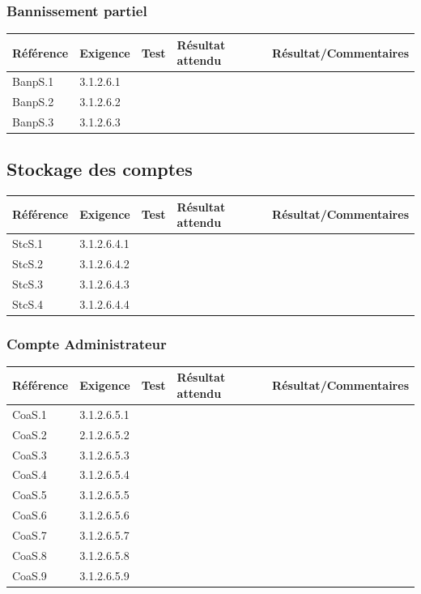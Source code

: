\documentclass[10pt,a4paper,landscape]{report}
\begin{document}
\subsubsection{Bannissement partiel}
\begin{center}
	\bgroup
	\def\arraystretch{1.5}
	\begin{tabular}{|p{1.5cm}|p{2cm}|p{8.5cm}|p{8.5cm}|p{5cm}|}
		\hline
		\rowcolor{gris}Référence & Exigence & Test & Résultat attendu & Résultat/Commentaires\\
		\hline
		BanpS.1 & 3.1.2.6.1 & & & \\
		\hline
		BanpS.2 & 3.1.2.6.2 & & & \\
		\hline
		BanpS.3 & 3.1.2.6.3 & & & \\
		\hline
	\end{tabular}
	\egroup
\end{center}


\subsection{Stockage des comptes}
\begin{center}
	\bgroup
	\def\arraystretch{1.5}
	\begin{tabular}{|p{1.5cm}|p{2cm}|p{8.5cm}|p{8.5cm}|p{5cm}|}
		\hline
		\rowcolor{gris}Référence & Exigence & Test & Résultat attendu & Résultat/Commentaires\\
		\hline
		StcS.1 & 3.1.2.6.4.1 & & & \\
		\hline
		StcS.2 & 3.1.2.6.4.2 & & & \\
		\hline
		StcS.3 & 3.1.2.6.4.3 & & & \\
		\hline
		StcS.4 & 3.1.2.6.4.4 & & & \\
		\hline
	\end{tabular}
	\egroup
\end{center}

\subsubsection{Compte Administrateur}
\begin{center}
	\bgroup
	\def\arraystretch{1.5}
	\begin{tabular}{|p{1.5cm}|p{2cm}|p{8.5cm}|p{8.5cm}|p{5cm}|}
		\hline
		\rowcolor{gris}Référence & Exigence & Test & Résultat attendu & Résultat/Commentaires\\
		\hline
		CoaS.1 & 3.1.2.6.5.1 & & & \\
		\hline
		CoaS.2 & 2.1.2.6.5.2 & & & \\
		\hline
		CoaS.3 & 3.1.2.6.5.3 & & & \\
		\hline
		CoaS.4 & 3.1.2.6.5.4 & & & \\
		\hline
		CoaS.5 & 3.1.2.6.5.5 & & & \\
		\hline
		CoaS.6 & 3.1.2.6.5.6 & & & \\
		\hline
		CoaS.7 & 3.1.2.6.5.7 & & & \\
		\hline
		CoaS.8 & 3.1.2.6.5.8 & & & \\
		\hline
		CoaS.9 & 3.1.2.6.5.9 & & & \\
		\hline
	\end{tabular}
	\egroup
\end{center}
\end{document}
